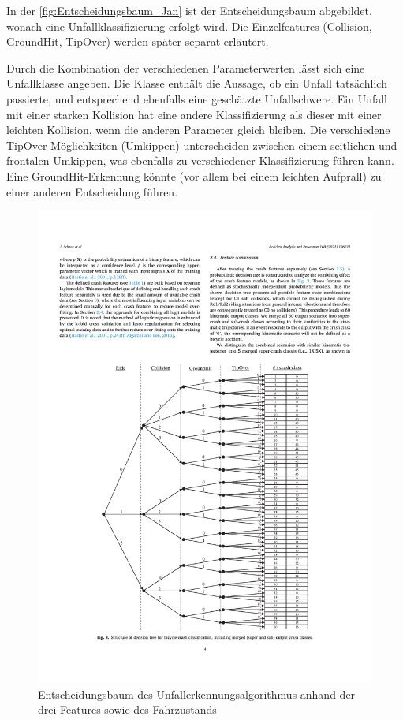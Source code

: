 %

In der \autoref{fig:Entscheidungsbaum_Jan} ist der Entscheidungsbaum abgebildet, wonach eine Unfallklassifizierung erfolgt wird. Die Einzelfeatures (Collision, GroundHit, TipOver) werden später separat erläutert.

Durch die Kombination der verschiedenen Parameterwerten lässt sich eine Unfallklasse angeben. Die Klasse enthält die Aussage, ob ein Unfall tatsächlich passierte, und entsprechend ebenfalls eine geschätzte Unfallschwere.
Ein Unfall mit einer starken Kollision hat eine andere Klassifizierung als dieser mit einer leichten Kollision, wenn die anderen Parameter gleich bleiben.
Die verschiedene TipOver-Möglichkeiten (Umkippen) unterscheiden zwischen einem seitlichen und frontalen Umkippen, was ebenfalls zu verschiedener Klassifizierung führen kann.
Eine GroundHit-Erkennung könnte (vor allem bei einem leichten Aufprall) zu einer anderen Entscheidung führen.
\begin{figure}[htpb]
	\centering
	\includegraphics[width=\linewidth]{Bilder/Entscheidungsbaum_Jan_pdf.pdf}
	\caption{Entscheidungsbaum des Unfallerkennungsalgorithmus anhand der drei Features sowie des Fahrzustands\citep{Schneeclassification2021}}
	\label{fig:Entscheidungsbaum_Jan}
\end{figure}

